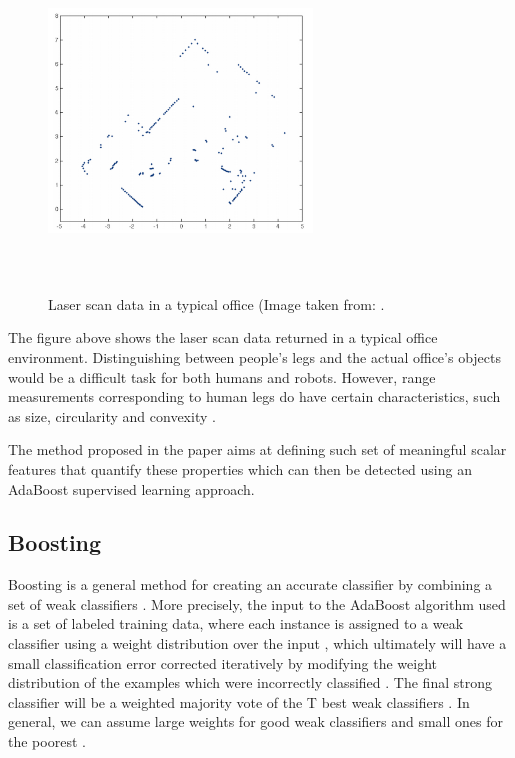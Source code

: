 \begin{figure}[!htbp]
\begin{center}
\includegraphics[width=7cm,height=9cm,keepaspectratio]{images/laser-data.png}
\end{center}
\caption{Laser scan data in a typical office (Image taken from: \cite{arras2007using}.}
\end{figure}

The figure above shows the laser scan data returned in a typical office environment. Distinguishing between people's legs and the actual office's objects would be a difficult task for both humans and robots. However, range measurements corresponding to human legs do have certain characteristics, such as size, circularity and convexity \cite{arras2007using}.

The method proposed in the paper aims at defining such set of meaningful scalar features that quantify these properties which can then be detected using an AdaBoost supervised learning approach.

\subsection{Boosting}

Boosting is a general method for creating an accurate classifier by combining a set of weak classifiers \cite{arras2007using}. More precisely, the input to the AdaBoost algorithm used is a set of labeled training data, where each instance is assigned to a weak classifier using a weight distribution over the input \cite{arras2007using}, which ultimately will have a small classification error corrected iteratively by modifying the weight distribution of the examples which were incorrectly classified \cite{arras2007using}. The final strong classifier will be a weighted majority vote of the T best weak classifiers \cite{arras2007using}. In general, we can assume large weights for good weak classifiers and small ones for the poorest \cite{arras2007using}.

